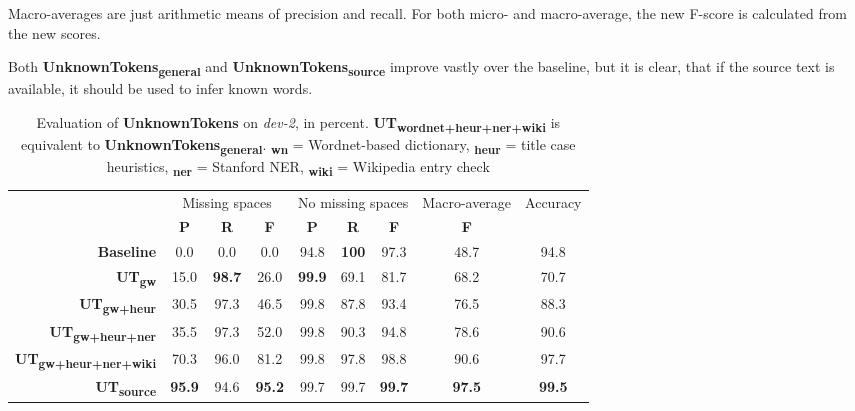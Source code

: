 \documentclass[a4paper,10pt]{scrartcl}
\theoremstyle{style}
\begin{document}
Macro-averages are just arithmetic means of precision and recall. For both micro- and macro-average, the new F-score is calculated from the new scores.

Both \textbf{UnknownTokens\textsubscript{general}} and \textbf{UnknownTokens\textsubscript{source}} improve vastly over the baseline, but it is clear, that if the source text is available, it should be used to infer known words.


\begin{table}
\begin{center}
\begin{tabular}{r|c|c|c|c|c|c|c|c|}
& \multicolumn{3}{c|}{Missing spaces} & \multicolumn{3}{c|}{No missing spaces} & Macro-average & Accuracy\\
& \textbf{P} & \textbf{R} & \textbf{F} & \textbf{P} & \textbf{R} & \textbf{F} & \textbf{F} & \\
\hline
\textbf{Baseline} & 0.0 & 0.0 & 0.0 & 94.8 & \textbf{100} & 97.3 & 48.7 & 94.8\\
\hline
\textbf{UT\textsubscript{gw}} & 15.0 & \textbf{98.7} & 26.0 & \textbf{99.9} & 69.1 & 81.7 & 68.2 & 70.7\\
\hline
\textbf{UT\textsubscript{gw+heur}} & 30.5 & 97.3 & 46.5 & 99.8 & 87.8 & 93.4 & 76.5 & 88.3\\
\hline
\textbf{UT\textsubscript{gw+heur+ner}} & 35.5 & 97.3 & 52.0 & 99.8 & 90.3 & 94.8 & 78.6 & 90.6\\
\hline
\textbf{UT\textsubscript{gw+heur+ner+wiki}} & 70.3 & 96.0 & 81.2 & 99.8 & 97.8 & 98.8 & 90.6 & 97.7\\
\hline
\textbf{UT\textsubscript{source}} & \textbf{95.9} & 94.6 & \textbf{95.2} & 99.7 & 99.7 & \textbf{99.7} & \textbf{97.5} & \textbf{99.5}\\
\end{tabular}
\end{center}
\caption{Evaluation of \textbf{UnknownTokens} on \textit{dev-2}, in percent. \textbf{UT\textsubscript{wordnet+heur+ner+wiki}} is equivalent to \textbf{UnknownTokens\textsubscript{general}}. \textbf{\textsubscript{wn}} = Wordnet-based dictionary, \textbf{\textsubscript{heur}} = title case heuristics, \textbf{\textsubscript{ner}} = Stanford NER, \textbf{\textsubscript{wiki}} = Wikipedia entry check}
\label{eval_unknowntokens}
\end{table}
\end{document}

